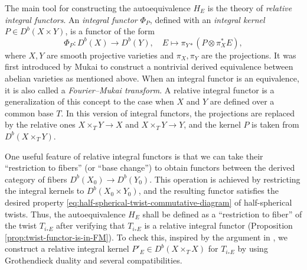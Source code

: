 \documentclass{amsart}
\numberwithin{equation}{section}
\theoremstyle{plain}
\theoremstyle{definition}
\begin{document}
The main tool for constructing the autoequivalence $H_E$ is the theory of \emph{relative integral functors}.
An \emph{integral functor} $\Phi_P$, defined with an \emph{integral kernel} $P \in D^b(X \times Y)$, is a functor of the form
\begin{equation}
    \Phi_P \colon D^b(X) \to D^b(Y), \quad E \mapsto \pi_{Y*}(P \otimes \pi_X^*E),
\end{equation}
where $X, Y$ are smooth projective varieties and $\pi_X, \pi_Y$ are the projections.
It was first introduced by Mukai \cite{MR607081} to construct a nontrivial derived equivalence between abelian varieties as mentioned above.
When an integral functor is an equivalence, it is also called a \emph{Fourier--Mukai transform}.
A relative integral functor is a generalization of this concept to the case when $X$ and $Y$ are defined over a common base $T$.
In this version of integral functors, the projections are replaced by the relative ones $X \times_T Y \to X$ and $X \times_T Y \to Y$, and the kernel $P$ is taken from $D^b(X \times_T Y)$.

One useful feature of relative integral functors is that we can take their ``restriction to fibers'' (or ``base change'') to obtain functors between the derived category of fibers $D^b(X_0) \to D^b(Y_0)$.
This operation is achieved by restricting the integral kernels to $D^b(X_0 \times Y_0)$, and the resulting functor satisfies the desired property \eqref{eq:half-spherical-twist-commutative-diagram} of half-spherical twists.
Thus, the autoequivalence $H_E$ shall be defined as a ``restriction to fiber'' of the twist $T_{i_*E}$ after verifying that $T_{i_*E}$ is a relative integral functor (Proposition \ref{prop:twist-functor-is-in-FM}).
To check this, inspired by the argument in \cite{MR2200048}, we construct a relative integral kernel $P'_E \in D^b(X \times_T X)$ for $T_{i_*E}$ by using Grothendieck duality and several compatibilities.
\end{document}
